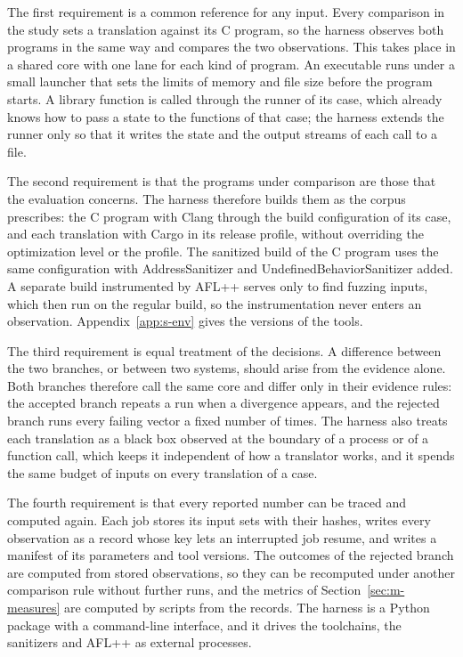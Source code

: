 The first requirement is a common reference for any input. Every comparison in the study sets a translation against its C program, so the harness observes both programs in the same way and compares the two observations. This takes place in a shared core with one lane for each kind of program. An executable runs under a small launcher that sets the limits of memory and file size before the program starts. A library function is called through the runner of its case, which already knows how to pass a state to the functions of that case; the harness extends the runner only so that it writes the state and the output streams of each call to a file.

The second requirement is that the programs under comparison are those that the evaluation concerns. The harness therefore builds them as the corpus prescribes: the C program with Clang through the build configuration of its case, and each translation with Cargo in its release profile, without overriding the optimization level or the profile. The sanitized build of the C program uses the same configuration with AddressSanitizer and UndefinedBehaviorSanitizer added. A separate build instrumented by AFL++ serves only to find fuzzing inputs, which then run on the regular build, so the instrumentation never enters an observation. Appendix~\ref{app:s-env} gives the versions of the tools.

The third requirement is equal treatment of the decisions. A difference between the two branches, or between two systems, should arise from the evidence alone. Both branches therefore call the same core and differ only in their evidence rules: the accepted branch repeats a run when a divergence appears, and the rejected branch runs every failing vector a fixed number of times. The harness also treats each translation as a black box observed at the boundary of a process or of a function call, which keeps it independent of how a translator works, and it spends the same budget of inputs on every translation of a case.

The fourth requirement is that every reported number can be traced and computed again. Each job stores its input sets with their hashes, writes every observation as a record whose key lets an interrupted job resume, and writes a manifest of its parameters and tool versions. The outcomes of the rejected branch are computed from stored observations, so they can be recomputed under another comparison rule without further runs, and the metrics of Section~\ref{sec:m-measures} are computed by scripts from the records. The harness is a Python package with a command-line interface, and it drives the toolchains, the sanitizers and AFL++ as external processes.

